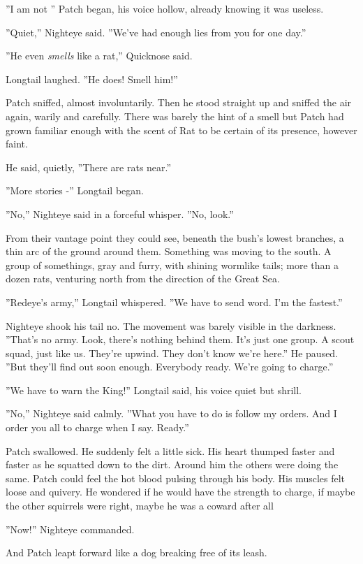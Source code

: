 \documentclass[12pt]{book}
\begin{document}
 ''I am not %
'' Patch began, his voice hollow, already knowing it was useless.\par
 ''Quiet,'' Nighteye said. ''We've had enough lies from you for one day.''\par
 ''He even {\it smells} like a rat,'' Quicknose said.\par
 Longtail laughed. ''He does! Smell him!''\par
 Patch sniffed, almost involuntarily. Then he stood straight up and sniffed the air again, warily and carefully. There was barely the hint of a smell %
 but Patch had grown familiar enough with the scent of Rat to be certain of its presence, however faint.\par
 He said, quietly, ''There are rats near.''\par
 ''More stories -'' Longtail began.\par
 ''No,'' Nighteye said in a forceful whisper. ''No, look.''\par
 From their vantage point they could see, beneath the bush's lowest branches, a thin arc of the ground around them. Something was moving to the south. A group of somethings, gray and furry, with shining wormlike tails; more than a dozen rats, venturing north from the direction of the Great Sea.\par
 ''Redeye's army,'' Longtail whispered. ''We have to send word. I'm the fastest.''\par
 Nighteye shook his tail no. The movement was barely visible in the darkness. ''That's no army. Look, there's nothing behind them. It's just one group. A scout squad, just like us. They're upwind. They don't know we're here.'' He paused. ''But they'll find out soon enough. Everybody ready. We're going to charge.''\par
 ''We have to warn the King!'' Longtail said, his voice quiet but shrill.\par
 ''No,'' Nighteye said calmly. ''What you have to do is follow my orders. And I order you all to charge when I say. Ready.''\par
 Patch swallowed. He suddenly felt a little sick. His heart thumped faster and faster as he squatted down to the dirt. Around him the others were doing the same. Patch could feel the hot blood pulsing through his body. His muscles felt loose and quivery. He wondered if he would have the strength to charge, if maybe the other squirrels were right, maybe he was a coward after all %
\par
 ''Now!'' Nighteye commanded.\par
And Patch leapt forward like a dog breaking free of its leash.\par
\end{document}
